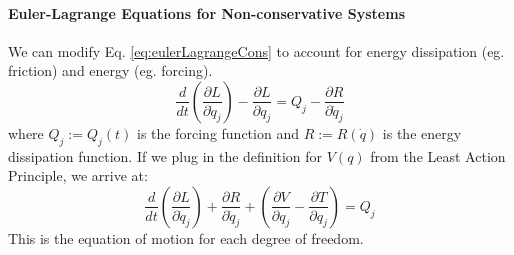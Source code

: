 \documentclass[../notes.tex]{subfiles}
\begin{document}
\paragraph{Euler-Lagrange Equations for Non-conservative Systems} We can modify Eq. \ref{eq:eulerLagrangeCons} to account for energy dissipation (eg. friction) and energy (eg. forcing).
\begin{equation}
    \frac{d}{dt}(\frac{\partial L}{\partial \dot{q}_j}) - \frac{\partial L}{\partial q_j} = Q_j - \frac{\partial R}{\partial \dot{q}_j}
\end{equation}
where $Q_j := Q_j(t)$ is the forcing function and $R:=R(\dot{q})$ is the energy dissipation function. If we plug in the definition for $V(q)$ from the Least Action Principle, we arrive at:
\begin{equation} \label{eq:eulerLagrangeFull}
    \frac{d}{dt}(\frac{\partial L}{\partial \dot{q}_j}) + \frac{\partial R}{\partial \dot{q}_j} + (\frac{\partial V}{\partial q_j} - \frac{\partial T}{\partial q_j}) = Q_j
\end{equation}
This is the equation of motion for each degree of freedom.
\end{document}
